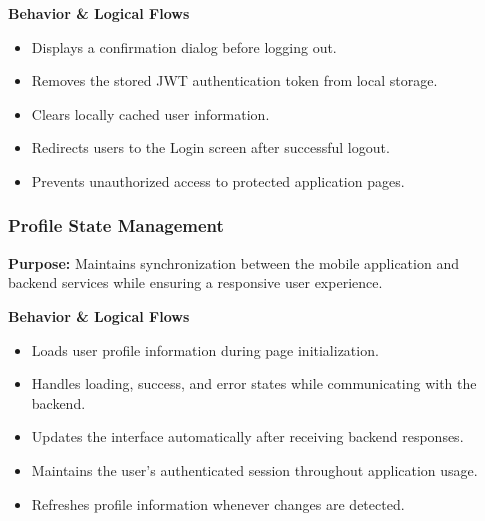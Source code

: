 \vspace{0.2cm}
\noindent\textbf{Behavior \& Logical Flows}

\begin{itemize}
    \item Displays a confirmation dialog before logging out.
    \item Removes the stored JWT authentication token from local storage.
    \item Clears locally cached user information.
    \item Redirects users to the Login screen after successful logout.
    \item Prevents unauthorized access to protected application pages.
\end{itemize}


\subsubsection{Profile State Management}

\textbf{Purpose:}
Maintains synchronization between the mobile application and backend services while ensuring a responsive user experience.

\vspace{0.2cm}
\noindent\textbf{Behavior \& Logical Flows}

\begin{itemize}
    \item Loads user profile information during page initialization.
    \item Handles loading, success, and error states while communicating with the backend.
    \item Updates the interface automatically after receiving backend responses.
    \item Maintains the user's authenticated session throughout application usage.
    \item Refreshes profile information whenever changes are detected.
\end{itemize}